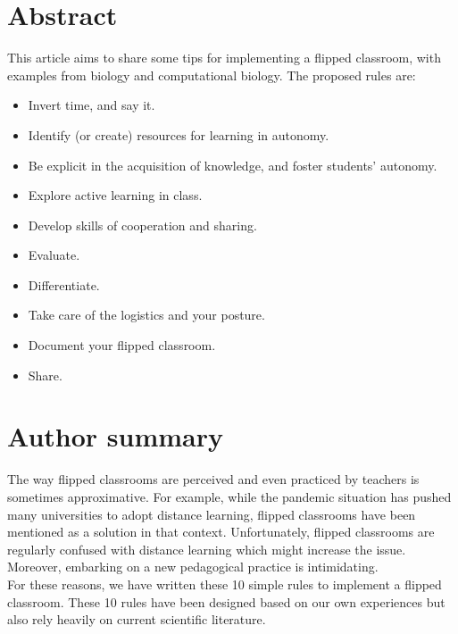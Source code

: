 \documentclass[10pt,letterpaper]{article}
\begin{document}
\section*{Abstract}

This article aims to share some tips for implementing a flipped classroom, with examples from biology and computational biology. 
The proposed rules are:

\begin{itemize}
\item Invert time, and say it.
\item Identify (or create) resources for learning in autonomy.
\item Be explicit in the acquisition of knowledge, and foster students' autonomy.
\item Explore active learning in class.
\item Develop skills of cooperation and sharing.
\item Evaluate.
\item Differentiate.
\item Take care of the logistics and your posture.
\item Document your flipped classroom.
\item Share.
\end{itemize}


\section*{Author summary}
The way flipped classrooms are perceived and even practiced by teachers is sometimes approximative. For example, while the pandemic situation has pushed many universities to adopt distance learning, flipped classrooms have been mentioned as a solution in that context. Unfortunately, flipped classrooms are regularly confused with distance learning which might increase the issue. Moreover, embarking on a new pedagogical practice is intimidating.\\

For these reasons, we have written these 10 simple rules to implement a flipped classroom. These 10 rules have been designed based on our own experiences but also rely heavily on current scientific literature.


\linenumbers

\end{document}
